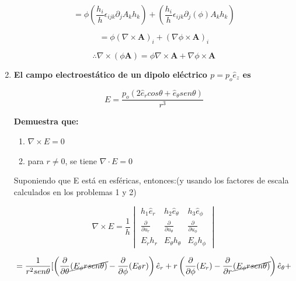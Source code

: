 \documentclass[12pt,a4paper]{article}
\begin{document}
\begin{enumerate}
    \begin{equation*}
        = \phi (\frac{h_i}{h} \epsilon_{ijk} \partial_j A_k h_k) +  (\frac{h_i}{h} \epsilon_{ijk} \partial_j (\phi) A_k h_k)
    \end{equation*}
    
    \begin{equation*}
        = \phi (\nabla \times \textbf{A})_i + (\nabla \phi \times \textbf{A})_i
    \end{equation*}
    
    \begin{equation*}
        \therefore \nabla \times (\phi \textbf{A}) = \phi \nabla \times \textbf{A} + \nabla \phi \times \textbf{A}
    \end{equation*}

    
    
    
    
    
    \item \textbf{El campo electroestático de un dipolo eléctrico $p = p_o \hat{e}_z$ es}
    
    \begin{equation*}
        E = \frac{p_o (2 \hat{e}_r cos \theta + \hat{e}_\theta sen \theta)}{r^3}
    \end{equation*}
    
    \textbf{Demuestra que:}
    \begin{enumerate}
        \item $\nabla \times E = 0$
        
        \item para $r \neq 0$, se tiene $\nabla \cdot E = 0$
    \end{enumerate}
    
    Suponiendo que E está en esféricas, entonces:(y usando los factores de escala calculados en los problemas 1 y 2)
    
    \begin{equation*}
        \nabla \times E = \frac{1}{h}
         \begin{vmatrix}
             h_1 \hat{e}_r & h_2 \hat{e}_\theta & h_3 \hat{e}_\phi\\
             \frac{\partial}{\partial u_r} & \frac{\partial }{\partial u_\theta} & \frac{\partial}{\partial u_\phi}\\
            E_r h_r & E_\theta h_\theta & E_\phi h_\phi
        \end{vmatrix}
    \end{equation*}
    
    \begin{equation*}
    =\frac{1}{r^2 sen\theta} [ \left(\frac{\partial}{\partial \theta} \cancel{(E_\phi r sen \theta)}- \frac{\partial}{\partial \phi} (E_\theta r) \right) \hat{e}_r + r\left( \frac{\partial}{\partial \phi} (E_r) -\frac{\partial}{\partial r}\cancel{(E_\phi r sen \theta)}\right) \hat{e}_\theta +
    \end{equation*}
    

\end{enumerate}
\end{document}

